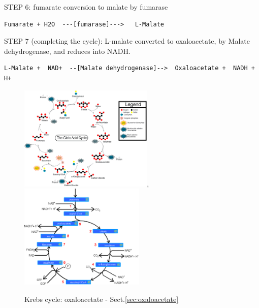 STEP 6: fumarate conversion to malate by fumarase

{\tiny
\begin{verbatim}
Fumarate + H2O  ---[fumarase]--->   L-Malate
\end{verbatim}
}

STEP 7 (completing the cycle):  L-malate converted to oxaloacetate, by Malate
dehydrogenase, and reduces  into NADH.

{\tiny
\begin{verbatim}
L-Malate +  NAD+  --[Malate dehydrogenase]-->  Oxaloacetate +  NADH + H+
\end{verbatim}
}


\begin{figure}[hbt]
  \centerline{\includegraphics[height=5cm,
    angle=0]{./images/Krebs_cycle.eps}, \includegraphics[height=5cm,
    angle=0]{./images/Krebs_cycle_2.eps}}
\caption{Krebs cycle: oxaloacetate - Sect.\ref{sec:oxaloacetate}}
\label{fig:Krebs_cycle}
\end{figure}




